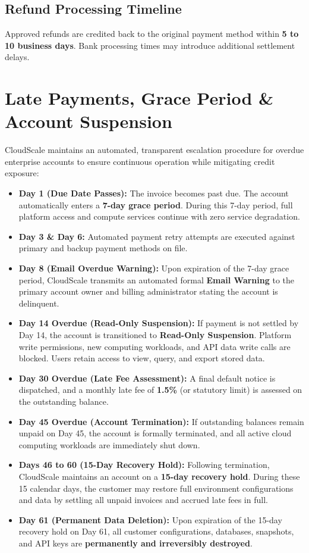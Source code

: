 \documentclass[10pt,letterpaper]{article}
\begin{document}
\subsection{Refund Processing Timeline}
Approved refunds are credited back to the original payment method within \textbf{5 to 10 business days}. Bank processing times may introduce additional settlement delays.

\section{Late Payments, Grace Period \& Account Suspension}

CloudScale maintains an automated, transparent escalation procedure for overdue enterprise accounts to ensure continuous operation while mitigating credit exposure:
\begin{itemize}
  \item \textbf{Day 1 (Due Date Passes):} The invoice becomes past due. The account automatically enters a \textbf{7-day grace period}. During this 7-day period, full platform access and compute services continue with zero service degradation.
  \item \textbf{Day 3 \& Day 6:} Automated payment retry attempts are executed against primary and backup payment methods on file.
  \item \textbf{Day 8 (Email Overdue Warning):} Upon expiration of the 7-day grace period, CloudScale transmits an automated formal \textbf{Email Warning} to the primary account owner and billing administrator stating the account is delinquent.
  \item \textbf{Day 14 Overdue (Read-Only Suspension):} If payment is not settled by Day 14, the account is transitioned to \textbf{Read-Only Suspension}. Platform write permissions, new computing workloads, and API data write calls are blocked. Users retain access to view, query, and export stored data.
  \item \textbf{Day 30 Overdue (Late Fee Assessment):} A final default notice is dispatched, and a monthly late fee of \textbf{1.5\%} (or statutory limit) is assessed on the outstanding balance.
  \item \textbf{Day 45 Overdue (Account Termination):} If outstanding balances remain unpaid on Day 45, the account is formally terminated, and all active cloud computing workloads are immediately shut down.
  \item \textbf{Days 46 to 60 (15-Day Recovery Hold):} Following termination, CloudScale maintains an account on a \textbf{15-day recovery hold}. During these 15 calendar days, the customer may restore full environment configurations and data by settling all unpaid invoices and accrued late fees in full.
  \item \textbf{Day 61 (Permanent Data Deletion):} Upon expiration of the 15-day recovery hold on Day 61, all customer configurations, databases, snapshots, and API keys are \textbf{permanently and irreversibly destroyed}.
\end{itemize}
\end{document}
